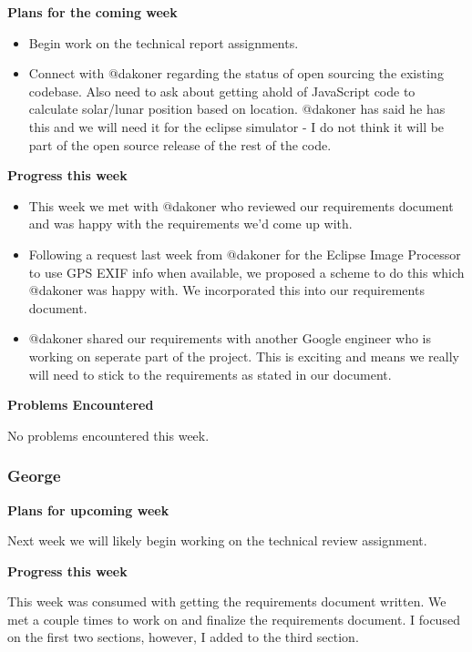 \documentclass[10pt, onecolumn, draftclsnofoot, letterpaper, compsoc]{IEEEtran}
\begin{document}
    \noindent \textbf{Plans for the coming week}

    \begin{itemize}
    \item Begin work on the technical report assignments.
    \item Connect with @dakoner regarding the status of open sourcing the existing codebase.
      Also need to ask about getting ahold of JavaScript code to calculate solar/lunar position based
      on location. @dakoner has said he has this and we will need it for the eclipse simulator - I do
      not think it will be part of the open source release of the rest of the code.

    \end{itemize}

    \noindent \textbf{Progress this week}

    \begin{itemize}
    \item This week we met with @dakoner who reviewed our requirements document and was happy with the
      requirements we'd come up with.
    \item Following a request last week from @dakoner for the Eclipse Image Processor to use GPS EXIF info
      when available, we proposed a scheme to do this which @dakoner was happy with. We incorporated this
      into our requirements document.
    \item @dakoner shared our requirements with another Google engineer who is working on seperate part of the
      project. This is exciting and means we really will need to stick to the requirements as stated in our
      document.

  \end{itemize}

    \noindent \textbf{Problems Encountered}

    No problems encountered this week.

    \subsubsection{George}

    \noindent \textbf{Plans for upcoming week}

    Next week we will likely begin working on the technical review assignment.

    \noindent \textbf{Progress this week}

    This week was consumed with getting the requirements document written. We met
    a couple times to work on and finalize the requirements document. I focused on
    the first two sections, however, I added to the third section.
\end{document}
